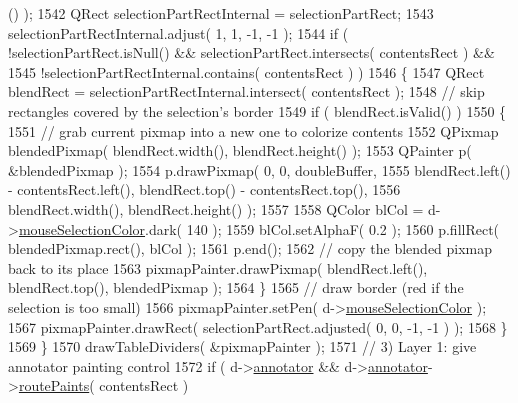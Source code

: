 \begin{DoxyCode}
       () );
1542                     QRect selectionPartRectInternal = selectionPartRect;
1543                     selectionPartRectInternal.adjust( 1, 1, -1, -1 );
1544                     \textcolor{keywordflow}{if} ( !selectionPartRect.isNull() && selectionPartRect.intersects( contentsRect ) &&
1545                         !selectionPartRectInternal.contains( contentsRect ) )
1546                     \{
1547                         QRect blendRect = selectionPartRectInternal.intersect( contentsRect );
1548                         \textcolor{comment}{// skip rectangles covered by the selection's border}
1549                         \textcolor{keywordflow}{if} ( blendRect.isValid() )
1550                         \{
1551                             \textcolor{comment}{// grab current pixmap into a new one to colorize contents}
1552                             QPixmap blendedPixmap( blendRect.width(), blendRect.height() );
1553                             QPainter p( &blendedPixmap );
1554                             p.drawPixmap( 0, 0, doubleBuffer,
1555                                         blendRect.left() - contentsRect.left(), blendRect.top() - 
      contentsRect.top(),
1556                                         blendRect.width(), blendRect.height() );
1557 
1558                             QColor blCol = d->\hyperlink{classPageViewPrivate_ab09ba74cc55e9a99a5e7c0629dde8feb}{mouseSelectionColor}.dark( 140 );
1559                             blCol.setAlphaF( 0.2 );
1560                             p.fillRect( blendedPixmap.rect(), blCol );
1561                             p.end();
1562                             \textcolor{comment}{// copy the blended pixmap back to its place}
1563                             pixmapPainter.drawPixmap( blendRect.left(), blendRect.top(), blendedPixmap );
1564                         \}
1565                         \textcolor{comment}{// draw border (red if the selection is too small)}
1566                         pixmapPainter.setPen( d->\hyperlink{classPageViewPrivate_ab09ba74cc55e9a99a5e7c0629dde8feb}{mouseSelectionColor} );
1567                         pixmapPainter.drawRect( selectionPartRect.adjusted( 0, 0, -1, -1 ) );
1568                     \}
1569                 \}
1570                 drawTableDividers( &pixmapPainter );
1571                 \textcolor{comment}{// 3) Layer 1: give annotator painting control}
1572                 \textcolor{keywordflow}{if} ( d->\hyperlink{classPageViewPrivate_a07bad73b61f6b400411aacc7e2e820a0}{annotator} && d->\hyperlink{classPageViewPrivate_a07bad73b61f6b400411aacc7e2e820a0}{annotator}->\hyperlink{classPageViewAnnotator_a6c9bb2e357dfa97da72ad0e610b4b7f6}{routePaints}( contentsRect )

\end{DoxyCode}

